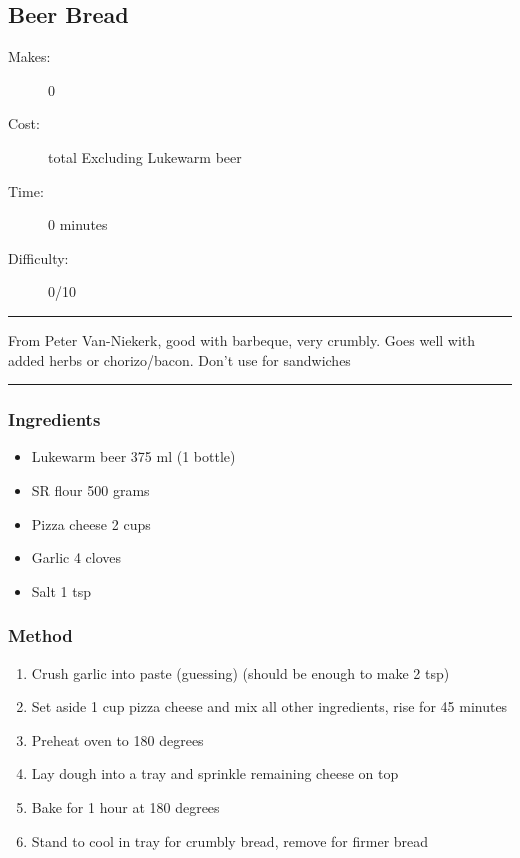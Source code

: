 \documentclass[]{article}
\begin{document}
\subsection*{\center\huge Beer Bread}
\begin{description}
\item[Makes:] 0 
\item[Cost:]  total Excluding Lukewarm beer
\item[Time:] 0 minutes
\item[Difficulty:] 0/10
\end{description}
\vspace{0.2cm}\hrule\vspace{0.5cm}
\begin{adjustwidth}{0.5 cm}{0.5 cm}

From Peter Van-Niekerk, good with barbeque, very crumbly. Goes well with added herbs or chorizo/bacon. Don't use for sandwiches \hfill\color{accent}{\Large\faVimeoSquare\hspace{0.1cm}}\color{black}

\end{adjustwidth}
\vspace{0.5cm}\hrule
\subsubsection*{\Large Ingredients}
\begin{multicols}{2}
\begin{itemize}
 \item Lukewarm beer \hfill 375 ml (1 bottle)
 \item SR flour \hfill 500 grams
 \item Pizza cheese \hfill 2 cups
 \item Garlic \hfill 4 cloves
 \item Salt \hfill 1 tsp
\end{itemize}
\end{multicols}
\subsubsection*{\Large Method}
\begin{enumerate}[font=\huge\color{accent}]
	\item Crush garlic into paste (guessing) (should be enough to make 2 tsp)
	\item Set aside 1 cup pizza cheese and mix all other ingredients, rise for 45 minutes
	\item Preheat oven to 180 degrees
	\item Lay dough into a tray and sprinkle remaining cheese on top
	\item Bake for 1 hour at 180 degrees
	\item Stand to cool in tray for crumbly bread, remove for firmer bread
\end{enumerate}
\newpage
{}\label{rec:Flatbread (Milk)}
\end{document}
